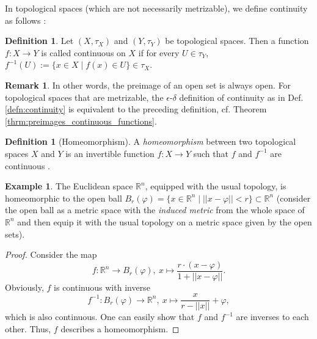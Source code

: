 \documentclass[12pt, a4paper]{article}
\numberwithin{equation}{section}
\theoremstyle{definition}
\theoremstyle{definition}
\newtheorem{defn}[thm]{Definition} %
\newtheorem{exmp}[thm]{Example} %
\newtheorem{remark}[thm]{Remark} %
\begin{document}
		In topological spaces (which are not necessarily metrizable), we define continuity as follows \cite{topology-singh}:
		
		\begin{defn}\label{defn:continuity_topological_spaces}
			Let $(X, \tau_X)$ and $(Y, \tau_Y)$ be topological spaces. Then a function $f: X \to Y$ is called continuous on $X$ if for every $U\in \tau_Y$, $f^{-1}(U) := \{ x\in X \mid f(x)\in U \} \in \tau_X$.
		\end{defn}
		
		\begin{remark}
			In other words, the preimage of an open set is always open. For topological spaces that are metrizable, the $\epsilon$-$\delta$ definition of continuity as in Def. \ref{defn:continuity} is equivalent to the preceding definition, cf. Theorem \ref{thrm:preimages_continuous_functions}.
		\end{remark}
	
		\begin{defn}[Homeomorphism] A \textit{homeomorphism} between two topological spaces $X$ and $Y$ is an invertible function $f: X\rightarrow Y$ such that $f$ and $f^{-1}$ are continuous \cite[p. 33]{topology-singh}. 
		\end{defn}
		
		\begin{exmp}
			The Euclidean space $\mathbb R^n$, equipped with the usual topology, is homeomorphic to the open ball $B_{r}(\varphi) =  \{x\in\mathbb R^n \mid \lvert\lvert x-\varphi \rvert\rvert < r \} \subset \mathbb R^n$ (consider the open ball as a metric space with the \textit{induced metric} from the whole space of $\mathbb R^n$ and then equip it with the usual topology on a metric space given by the open sets). 
		\end{exmp}
		
		\begin{proof}
			Consider the map $$f: \mathbb R^n\rightarrow B_r(\varphi), \ x\mapsto \frac{r\cdot (x-\varphi)}{1+\lvert\lvert x-\varphi\rvert\rvert}.$$ Obviously, $f$ is continuous with inverse $$f^{-1}: B_r(\varphi)\rightarrow \mathbb R^n, \ x \mapsto \frac{x}{r-\lvert\lvert x\rvert\rvert}+\varphi,$$ which is also continuous. One can easily show that $f$ and $f^{-1}$ are inverses to each other. Thus, $f$ describes a homeomorphism. 	
		\end{proof}
				
\end{document}
